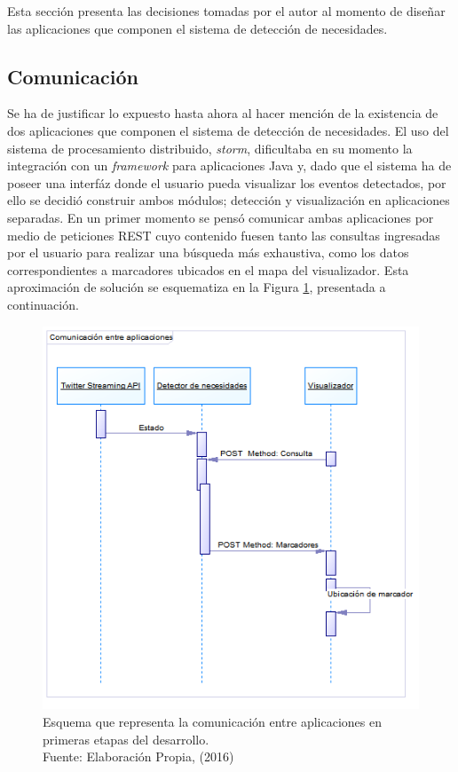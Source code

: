 Esta sección presenta las decisiones tomadas por el autor al momento de diseñar las aplicaciones que componen el sistema de detección de necesidades.

\subsection{Comunicación}
\label{sec:diseno:comunicacion}

Se ha de justificar lo expuesto hasta ahora al hacer mención de la existencia de dos aplicaciones que componen el sistema de detección de necesidades. El uso del sistema de procesamiento distribuido, \textit{storm}, dificultaba en su momento la integración con un \textit{framework} para aplicaciones Java y, dado que el sistema ha de poseer una interfáz donde el usuario pueda visualizar los eventos detectados, por ello se decidió construir ambos módulos; detección y visualización en aplicaciones separadas. En un primer momento se pensó comunicar ambas aplicaciones por medio de peticiones REST cuyo contenido fuesen tanto las consultas ingresadas por el usuario para realizar una búsqueda más exhaustiva, como los datos correspondientes a marcadores ubicados en el mapa del visualizador. Esta aproximación de solución se esquematiza en la Figura \ref{fig:primeraComunicacion}, presentada a continuación.

\begin{figure}[H]
	\centering
	\captionsetup{justification=centering}
	\includegraphics[scale=0.8]{images/PrimeraComunicacion.png}
	\caption[Esquema que representa la comunicación entre aplicaciones en primeras etapas del desarrollo.]{Esquema que representa la comunicación entre aplicaciones en primeras etapas del desarrollo.\\Fuente: Elaboración Propia, (2016)}
	\label{fig:primeraComunicacion}
\end{figure}

